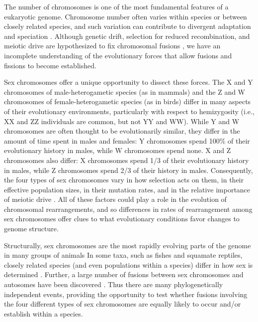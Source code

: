 The number of chromosomes is one of the most fundamental features of a eukaryotic genome. Chromosome number often varies within species or between closely related species, and such variation can contribute to divergent adaptation and speciation \citep{White1973, King1993, PerezOrtin2002, Chang2013, Hou2014}. Although genetic drift, selection for reduced recombination, and meiotic drive are hypothesized to fix chromosomal fusions \citep{Nachman1995, Guerrero2014}, we have an incomplete understanding of the evolutionary forces that allow fusions and fissions to become established.

Sex chromosomes offer a unique opportunity to dissect these forces. The X and Y chromosomes of male-heterogametic species (as in mammals) and the Z and W chromosomes of female-heterogametic species (as in birds) differ in many aspects of their evolutionary environments, particularly with respect to hemizygosity (i.e., XX and ZZ individuals are common, but not YY and WW). While Y and W chromosomes are often thought to be evolutionarily similar, they differ in the amount of time spent in males and females: Y chromosomes spend 100\% of their evolutionary history in males, while W chromosomes spend none. X and Z chromosomes also differ: X chromosomes spend 1/3 of their evolutionary history in males, while Z chromosomes spend 2/3 of their history in males. Consequently, the four types of sex chromosomes vary in how selection acts on them, in their effective population sizes, in their mutation rates, and in the relative importance of meiotic drive \citep{Ellegren2011, Bachtrog2011, Perrinbook}. All of these factors could play a role in the evolution of chromosomal rearrangements, and so differences in rates of rearrangement among sex chromosomes offer clues to what evolutionary conditions favor changes to genome structure.

Structurally, sex chromosomes are the most rapidly evolving parts of the genome in many groups of animals \citep{White1973, Bull1983, Ezaz2006,Perrinbook} In some taxa, such as fishes and squamate reptiles, closely related species (and even populations within a species) differ in how sex is determined \citep{Ezaz2006, Bachtrog2014}. Further, a large number of fusions between sex chromosomes and autosomes have been discovered \citep{White1973, ToS}. Thus there are many phylogenetically independent events, providing the opportunity to test whether fusions involving the four different types of sex chromosomes are equally likely to occur and/or establish within a species.
 
